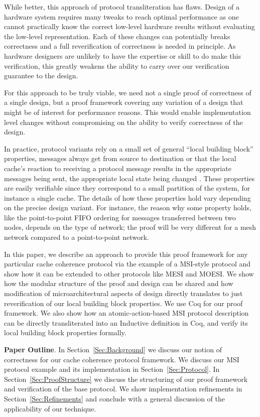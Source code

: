 While better, this approach of protocol transliteration has
flaws. Design of a hardware system requires many tweaks to reach
optimal performance as one cannot practically know the correct
low-level hardware results without evaluating the low-level
representation.  Each of these changes can potentially breaks
correctness and a full reverification of correctness is needed in
principle. As hardware designers are unlikely to have the expertise or
skill to do make this verification, this greatly weakens the ability
to carry over our verification guarantee to the design.

For this approach to be truly viable, we need not a single proof of
correctness of a single design, but a proof framework covering any
variation of a design that might be of interest for performance
reasons. This would enable implementation level changes without
compromising on the ability to verify correctness of the design.

In practice, protocol variants rely on a small set of general ``local
building block'' properties, \eg{} messages always get from source to
destination or that the local cache's reaction to receiving a protocol
message results in the appropriate messages being sent, the
appropriate local state being changed \etc{}.  These properties are
easily verifiable since they correspond to a small partition of the
system, for instance a single cache.  The details of how these
properties hold vary depending on the precise design variant. For
instance, the reason why some property holds, like the point-to-point
FIFO ordering for messages transferred between two nodes, depends on
the type of network; the proof will be very different for a mesh
network compared to a point-to-point network.

In this paper, we describe an approach to provide this proof framework
for any particular cache coherence protocol via the example of a
MSI-style protocol and show how it can be extended to other protocols
like MESI and MOESI. We show how the modular structure of the proof
and design can be shared and how modification of microarchitectural
aspects of design directly translates to just reverification of our
local building block properties. We use Coq for our proof
framework. We also show how an atomic-action-based MSI protocol
description can be directly transliterated into an Inductive
definition in Coq, and verify its local building block properties
formally.

\noindent\textbf{Paper Outline}. In Section~\ref{Sec:Background} we
discuss our notion of correctness for our cache coherence protocol
framework. We discuss our MSI protocol example and its implementation
in Section~\ref{Sec:Protocol}. In Section~\ref{Sec:ProofStructure} we discuss
the structuring of our proof framework and verification of the base
protocol. We show implementation refinements in
Section~\ref{Sec:Refinements} and conclude with a general discussion
of the applicability of our technique.
